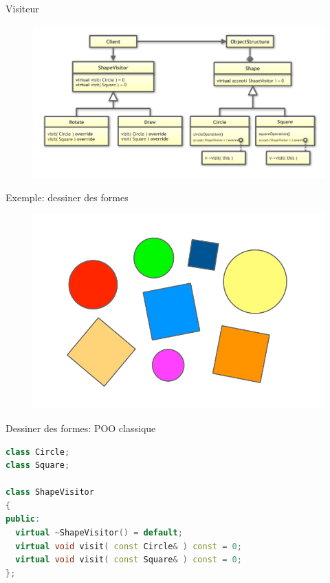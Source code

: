 \documentclass[french]{beamer}
\begin{document}
\begin{frame}{Visiteur}
    \begin{figure}
        \includegraphics[width=\linewidth]{visitor.png}
    \end{figure}
\end{frame}

\begin{frame}{Exemple: dessiner des formes}
    \begin{figure}
        \includegraphics[width=0.8\linewidth]{formes.png}
    \end{figure}
\end{frame}

\begin{frame}[fragile]{Dessiner des formes: POO classique}
    \begin{lstlisting}[language=C++]
class Circle;
class Square;

class ShapeVisitor
{
public:
  virtual ~ShapeVisitor() = default;
  virtual void visit( const Circle& ) const = 0;
  virtual void visit( const Square& ) const = 0;
};
    \end{lstlisting}
\end{frame}
\end{document}
